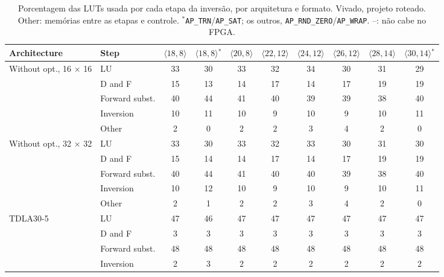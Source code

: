 \begin{table}[htbp]
\caption[Porcentagem das LUTs usada por cada etapa da inversão, por arquitetura e formato.]{Porcentagem das LUTs usada por cada etapa da inversão, por arquitetura e formato. Vivado, projeto roteado. Other: memórias entre as etapas e controle. $^{*}$\texttt{AP\_TRN}/\texttt{AP\_SAT}; os outros, \texttt{AP\_RND\_ZERO}/\texttt{AP\_WRAP}. --: não cabe no FPGA.}
\label{tab:etapas-lut}
\vspace{4pt} %
\centering
\scriptsize
\renewcommand{\arraystretch}{1.05}
\setlength{\tabcolsep}{3pt}
\begin{tabular}{llcccccccc}
\toprule
\textbf{Architecture} & \textbf{Step} & \textbf{$\langle 18,8\rangle$} & \textbf{$\langle 18,8\rangle$$^{*}$} & \textbf{$\langle 20,8\rangle$} & \textbf{$\langle 22,12\rangle$} & \textbf{$\langle 24,12\rangle$} & \textbf{$\langle 26,12\rangle$} & \textbf{$\langle 28,14\rangle$} & \textbf{$\langle 30,14\rangle$$^{*}$} \\
\midrule
\multirow{5}{*}{Without opt., 16 $\times$ 16} & LU & 33 & 30 & 33 & 32 & 34 & 30 & 31 & 29 \\
 & D and F & 15 & 13 & 14 & 17 & 14 & 17 & 19 & 19 \\
 & Forward subst. & 40 & 44 & 41 & 40 & 39 & 39 & 38 & 40 \\
 & Inversion & 10 & 11 & 10 & 9 & 10 & 9 & 10 & 11 \\
 & Other & 2 & 0 & 2 & 2 & 3 & 4 & 2 & 0 \\
\midrule
\multirow{5}{*}{Without opt., 32 $\times$ 32} & LU & 33 & 30 & 33 & 32 & 33 & 30 & 31 & 30 \\
 & D and F & 15 & 14 & 14 & 17 & 14 & 17 & 19 & 19 \\
 & Forward subst. & 40 & 44 & 41 & 40 & 40 & 39 & 38 & 40 \\
 & Inversion & 10 & 12 & 10 & 9 & 10 & 9 & 10 & 11 \\
 & Other & 2 & 1 & 2 & 2 & 3 & 4 & 2 & 0 \\
\midrule
\multirow{5}{*}{TDLA30-5} & LU & 47 & 46 & 47 & 47 & 47 & 47 & 47 & 47 \\
 & D and F & 3 & 3 & 3 & 3 & 3 & 3 & 3 & 3 \\
 & Forward subst. & 48 & 48 & 48 & 48 & 48 & 48 & 48 & 48 \\
 & Inversion & 2 & 3 & 2 & 2 & 2 & 2 & 2 & 2 \\

\end{tabular}
\end{table}
